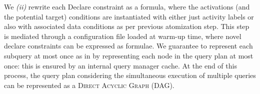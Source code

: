 We \textit{(ii)} rewrite each Declare constraint as a \xLTLf formula, where the activations (and the potential target) conditions are instantiated with either just activity labels or also with associated data conditions as per previous atomization step. This step is mediated through a configuration file loaded at warm-up time, where novel declare constraints can be expressed as \xLTLf formulae. We guarantee to represent each subquery at most once as in \cite{BellatrecheKB21} by representing each node in the query plan at most once: this is ensured by an internal query manager cache. At the end of this process, the query plan considering the simultaneous execution of multiple queries can be represented as a \textsc{Direct Acyclic Graph} (DAG).  
